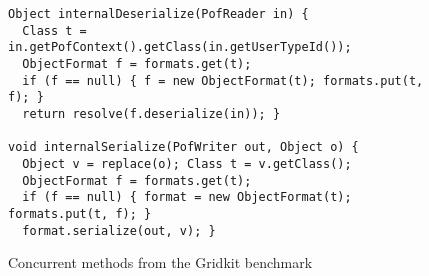 \begin{figure}[tb]
%
\begin{lstlisting}
Object internalDeserialize(PofReader in) {
  Class t = in.getPofContext().getClass(in.getUserTypeId());
  ObjectFormat f = formats.get(t);
  if (f == null) { f = new ObjectFormat(t); formats.put(t, f); }
  return resolve(f.deserialize(in)); }

void internalSerialize(PofWriter out, Object o) {
  Object v = replace(o); Class t = v.getClass();
  ObjectFormat f = formats.get(t);
  if (f == null) { format = new ObjectFormat(t); formats.put(t, f); }
  format.serialize(out, v); }
\end{lstlisting}
	\caption{\label{Fi:gridkitPair}Concurrent methods from the Gridkit benchmark}
\end{figure}




